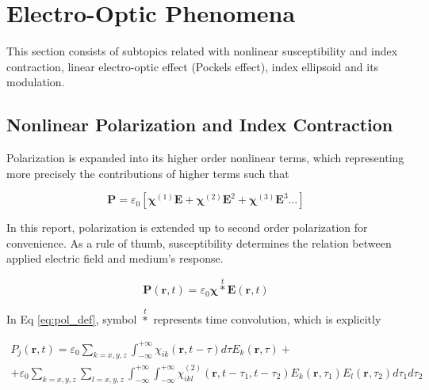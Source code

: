 \documentclass[thesis]{deutez}
\begin{document}
    
    \section{Electro-Optic Phenomena}

    This section consists of subtopics related with nonlinear susceptibility and index contraction, linear electro-optic effect (Pockels effect), index ellipsoid and its modulation. 

    \subsection{Nonlinear Polarization and Index Contraction}

    Polarization is expanded into its higher order nonlinear terms, which representing more precisely the contributions of higher terms such that

    \begin{equation}
        \mathbf{P} = \varepsilon_0 \left[ \bm\chi^{(1)} \mathbf{E}+\bm\chi^{(2)}\mathbf{E}^{2} +\bm\chi^{(3)}\mathbf{E}^{3} \dots  \right]
        \label{eq:pol_lin_nonlin}
    \end{equation}
    
    In this report, polarization is extended up to second order polarization for convenience. As a rule of thumb, susceptibility determines the relation between applied electric field and medium's response. 

    \begin{equation}
        \mathbf{P}(\mathbf{r},t) = \varepsilon_0 \bm\chi \overset{t}{\ast} \mathbf{E}(\mathbf{r},t)
        \label{eq:pol_def}
    \end{equation}

    In Eq \ref{eq:pol_def}, symbol $\overset{t}{\ast}$ represents time convolution, which is explicitly

    \begin{equation}
        \begin{split}
        P_j(\mathbf{r},t) = \varepsilon_0 \sum_{k=x,y,z}\int_{-\infty}^{+\infty} \chi_{ik}(\mathbf{r},t-\tau)d\tau E_k(\mathbf{r},\tau) + \\ 
        + \varepsilon_0 \sum_{k=x,y,z}\sum_{l=x,y,z}\int_{-\infty}^{+\infty} \int_{-\infty}^{+\infty} \chi_{ikl}^{(2)}(\mathbf{r},t-\tau_1,t-\tau_2) E_k(\mathbf{r},\tau_1) E_l(\mathbf{r},\tau_2) d\tau_1 d\tau_2 
        \label{eq:pol_conv_explicit}
        \end{split}
    \end{equation}
    
\end{document}
